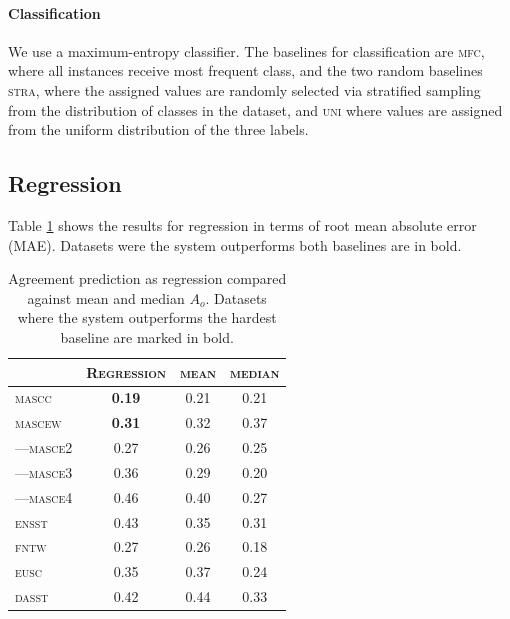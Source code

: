 \documentclass[11pt,a4paper]{article}
\begin{document}
\paragraph{Classification} We use a maximum-entropy classifier. The baselines for classification are \textsc{mfc}, where all instances receive most frequent class, and the two random baselines \textsc{stra}, where the assigned values are randomly selected via stratified sampling from the distribution of classes in the dataset, and \textsc{uni} where values are assigned from the uniform distribution of the three labels. 

\subsection{Regression}
\label{sec:reg}
Table \ref{tab:regagr_results} shows the results for regression in terms of root mean absolute error (MAE). Datasets were the system outperforms both baselines are in bold.


\begin{table}[Ht!]

\begin{center}
  \begin{tabular}{lc|cc}
 \toprule
 & \textsc{Regression} & \textsc{mean} & \textsc{median} \\
 \midrule
 \textsc{mascc} & \textbf{0.19} & 0.21 & 0.21 \\
 \textsc{mascew} & \textbf{0.31} & 0.32 & 0.37 \\
---\textsc{masce2} & {0.27} & 0.26 & 0.25 \\
---\textsc{masce3} & {0.36} & 0.29 & 0.20 \\
---\textsc{masce4} & {0.46} & 0.40 & 0.27 \\
\textsc{ensst} & {0.43} & 0.35 & 0.31 \\
\textsc{fntw} & {0.27} & 0.26 & 0.18 \\

\textsc{eusc} & 0.35 & 0.37 & 0.24 \\
\textsc{dasst} & 0.42 & 0.44 & 0.33 \\

\bottomrule

  \end{tabular}  
\end{center}
\caption{Agreement prediction as regression compared against mean and median $A_o$. Datasets where the system outperforms the hardest baseline are marked in bold. \label{tab:regagr_results}}
\end{table} 
\end{document}

